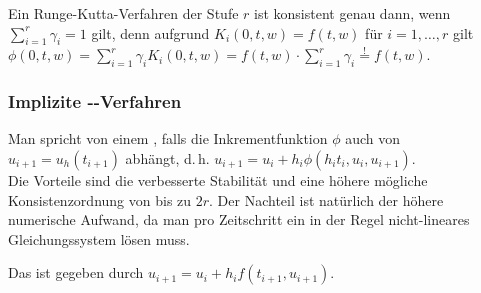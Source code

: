 \begin{Bem}
    Ein Runge-Kutta-Verfahren der Stufe $r$ ist konsistent genau dann, wenn\\
    $\sum_{i=1}^r \gamma_i = 1$ gilt, denn
    aufgrund $K_i(0, t, w) = f(t, w)$ für $i = 1, \dotsc, r$ gilt\\
    $\phi(0, t, w) = \sum_{i=1}^r \gamma_i K_i(0, t, w) =
    f(t, w) \cdot \sum_{i=1}^r \gamma_i \overset{!}{=} f(t, w)$.
\end{Bem}

\subsubsection{%
    Implizite --Verfahren%
}

\begin{Bem}
    Man spricht von einem ,
    falls die Inkrementfunktion $\phi$ auch von $u_{i+1} = u_h(t_{i+1})$
    abhängt, d.\,h. $u_{i+1} = u_i + h_i \phi(h_i t_i, u_i, u_{i+1})$.\\
    Die Vorteile sind die verbesserte Stabilität und
    eine höhere mögliche Konsistenzordnung von bis zu $2r$.
    Der Nachteil ist natürlich der höhere numerische Aufwand, da man pro
    Zeitschritt ein in der Regel nicht-lineares Gleichungssystem lösen muss.
\end{Bem}

\begin{Bsp}
    Das  ist gegeben durch
    $u_{i+1} = u_i + h_i f(t_{i+1}, u_{i+1})$.
\end{Bsp}

\linie

